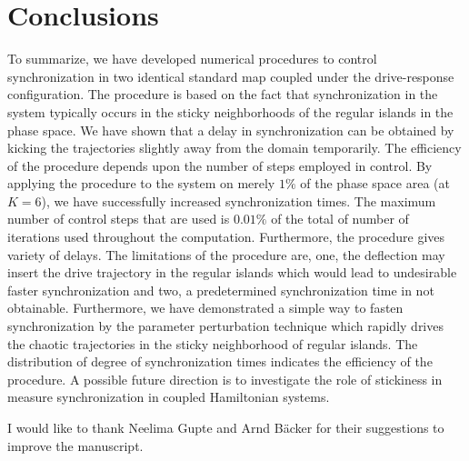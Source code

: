 \documentclass[reprint,superscriptaddress,amsmath,amssymb,aps,pre]{revtex4-1}
\begin{document}
\section{Conclusions}
\label{sec:conclusions}
To summarize, we have developed numerical procedures to control synchronization in two identical standard map coupled under the drive-response configuration. The procedure is based on the fact that synchronization in the system typically occurs in the sticky neighborhoods of the regular islands in the phase space. We have shown that a delay in synchronization can be obtained by kicking the trajectories slightly away from the domain temporarily. The efficiency of the procedure depends upon the number of steps employed in control. By applying the procedure to the system on merely $1\%$ of the phase space area (at $K = 6$), we have successfully increased synchronization times. The maximum number of control steps that are used is $0.01\%$ of the total of number of iterations used throughout the computation.  Furthermore, the procedure gives variety of delays. The limitations of the procedure are, one, the deflection may insert the drive trajectory in the regular islands which would lead to undesirable faster synchronization and two, a predetermined synchronization time in not obtainable. Furthermore, we have demonstrated a simple way to fasten synchronization by the parameter perturbation technique which rapidly drives the chaotic trajectories in the sticky neighborhood of regular islands. The distribution of degree of synchronization times indicates the efficiency of the procedure. A possible future direction is to investigate the role of stickiness in measure synchronization in coupled Hamiltonian systems.

\begin{acknowledgments}
I would like to thank Neelima Gupte and Arnd B\"acker for their suggestions to improve the manuscript. 
\end{acknowledgments}




\appendix


%
%
%
%
%




\end{document}
